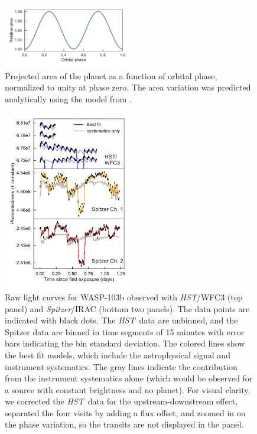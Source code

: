 \documentclass[twocolumn]{aastex61}
\newcommand{\project}[1]{\textsl{#1}}
\newcommand{\HST}{\project{HST}}
\newcommand{\Spitzer}{\project{Spitzer}}
\begin{document}
\begin{figure}
\includegraphics[width = 0.5\textwidth]{fig2.pdf}
\caption{Projected area of the planet as a function of orbital phase, normalized to unity at phase zero. The area variation was predicted analytically using the model from \cite{leconte11b}.}
\label{fig:ellipsoidal}
\end{figure}

\begin{figure}
\includegraphics[width = 0.5\textwidth]{fig3.pdf}
\caption{Raw light curves for WASP-103b observed with \HST/WFC3 (top panel) and \Spitzer/IRAC (bottom two panels). The data points are indicated with black dots. The \HST\ data are unbinned, and the Spitzer data are binned in time segments of 15 minutes with error bars indicating the bin standard deviation. The colored lines show the best fit models, which include the astrophysical signal and instrument systematics. The gray lines indicate the contribution from the instrument systematics alone (which would be observed for a source with constant brightness and no planet). For visual clarity, we corrected the \HST\ data for the upstream-downstream effect, separated the four visits by adding a flux offset, and zoomed in on the phase variation, so the transits are not displayed in the panel.}
\label{fig:systematics}
\end{figure}
\end{document}
